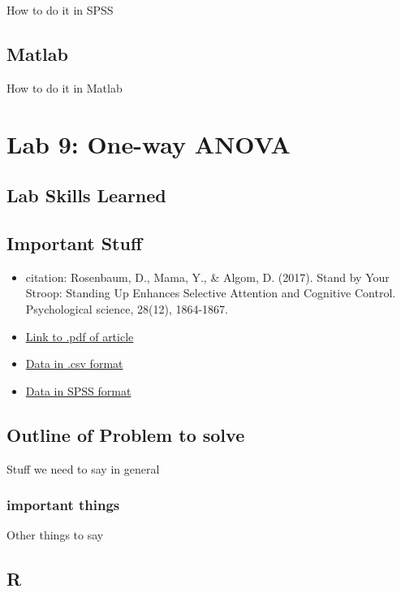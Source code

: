 \documentclass[]{book}
\providecommand{\tightlist}{%
  \setlength{\itemsep}{0pt}\setlength{\parskip}{0pt}}
\theoremstyle{definition}
\theoremstyle{definition}
\theoremstyle{definition}
\theoremstyle{remark}
\begin{document}
How to do it in SPSS

\section{Matlab}\label{matlab-7}

How to do it in Matlab

\chapter{Lab 9: One-way ANOVA}\label{lab-9-one-way-anova}

\section{Lab Skills Learned}\label{lab-skills-learned-3}

\section{Important Stuff}\label{important-stuff-3}

\begin{itemize}
\tightlist
\item
  citation: Rosenbaum, D., Mama, Y., \& Algom, D. (2017). Stand by Your
  Stroop: Standing Up Enhances Selective Attention and Cognitive
  Control. Psychological science, 28(12), 1864-1867.
\item
  \href{http://journals.sagepub.com/doi/abs/10.1177/0956797617721270?journalCode=pssa}{Link
  to .pdf of article}
\item
  \href{}{Data in .csv format}
\item
  \href{}{Data in SPSS format}
\end{itemize}

\section{Outline of Problem to
solve}\label{outline-of-problem-to-solve-4}

Stuff we need to say in general

\subsection{important things}\label{important-things-4}

Other things to say

\section{R}\label{r-9}
\end{document}
